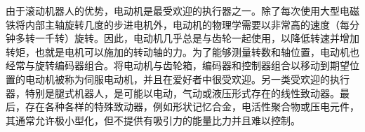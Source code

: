 
由于滚动机器人的优势，电动机是最受欢迎的执行器之一。除了每次使用大型电磁铁将内部主轴旋转几度的步进电机外，电动机的物理学需要以非常高的速度（每分钟多转一千转）旋转。因此，电动机几乎总是与齿轮一起使用，以降低转速并增加转矩，也就是电机可以施加的转动轴的力。为了能够测量转数和轴位置，电动机也经常与旋转编码器组合。将电动机与齿轮箱，编码器和控制器组合以移动到期望位置的电动机被称为伺服电动机，并且在爱好者中很受欢迎。另一类受欢迎的执行器，特别是腿式机器人，是可能以电动，气动或液压形式存在的线性致动器。最后，存在各种各样的特殊致动器，例如形状记忆合金，电活性聚合物或压电元件，其通常允许极小型化，但不提供有吸引力的能量比力并且难以控制。


